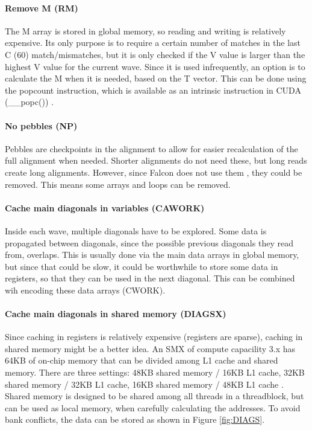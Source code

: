\documentclass[../main/thesis.tex]{subfiles}
\begin{document}
\paragraph{Remove M (RM)}
The M array is stored in global memory, so reading and writing is relatively expensive.
Its only purpose is to require a certain number of matches in the last C (60) match/mismatches, but it is only checked if the V value is larger than the highest V value for the current wave.
Since it is used infrequently, an option is to calculate the M when it is needed, based on the T vector.
This can be done using the popcount instruction, which is available as an intrinsic instruction in CUDA (\_\_popc()) \cite{CUDA_math}. 

\paragraph{No pebbles (NP)}
Pebbles are checkpoints in the alignment to allow for easier recalculation of the full alignment when needed.
Shorter alignments do not need these, but long reads create long alignments.
However, since Falcon does not use them \cite{Falcon}, they could be removed.
This means some arrays and loops can be removed.

\paragraph{Cache main diagonals in variables (CAWORK)}
Inside each wave, multiple diagonals have to be explored.
Some data is propagated between diagonals, since the possible previous diagonals they read from, overlaps.
This is usually done via the main data arrays in global memory, but since that could be slow, it could be worthwhile to store some data in registers, so that they can be used in the next diagonal.
This can be combined wih encoding these data arrays (CWORK).

\paragraph{Cache main diagonals in shared memory (DIAGSX)}
Since caching in registers is relatively expensive (registers are sparse), caching in shared memory might be a better idea.
An SMX of compute capacility 3.x has 64KB of on-chip memory that can be divided among L1 cache and shared memory.
There are three settings: 48KB shared memory / 16KB L1 cache, 32KB shared memory / 32KB L1 cache, 16KB shared memory / 48KB L1 cache \cite{shared_mem}.
Shared memory is designed to be shared among all threads in a threadblock, but can be used as local memory, when carefully calculating the addresses.
To avoid bank conflicts, the data can be stored as shown in Figure \ref{fig:DIAGS}.
\end{document}
